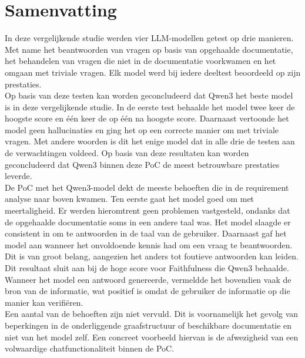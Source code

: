 \section{Samenvatting}
In deze vergelijkende studie werden vier LLM-modellen getest op drie manieren. Met name het beantwoorden van vragen op basis van opgehaalde documentatie, het behandelen van vragen die niet in de documentatie voorkwamen en het omgaan met triviale vragen. Elk model werd bij iedere deeltest beoordeeld op zijn prestaties.
\\[1em]
Op basis van deze testen kan worden geconcludeerd dat Qwen3 het beste model is in deze vergelijkende studie. In de eerste test behaalde het model twee keer de hoogste score en één keer de op één na hoogste score. Daarnaast vertoonde het model geen hallucinaties en ging het op een correcte manier om met triviale vragen. Met andere woorden is dit het enige model dat in alle drie de testen aan de verwachtingen voldeed. Op basis van deze resultaten kan worden geconcludeerd dat Qwen3 binnen deze PoC de meest betrouwbare prestaties leverde.
\\[1em]
De PoC met het Qwen3-model dekt de meeste behoeften die in de requirement analyse naar boven kwamen. Ten eerste gaat het model goed om met meertaligheid. Er werden hieromtrent geen problemen vastgesteld, ondanks dat de opgehaalde documentatie soms in een andere taal was. Het model slaagde er consistent in om te antwoorden in de taal van de gebruiker. Daarnaast gaf het model aan wanneer het onvoldoende kennis had om een vraag te beantwoorden. Dit is van groot belang, aangezien het anders tot foutieve antwoorden kan leiden. Dit resultaat sluit aan bij de hoge score voor Faithfulness die Qwen3 behaalde. Wanneer het model een antwoord genereerde, vermeldde het bovendien vaak de bron van de informatie, wat positief is omdat de gebruiker de informatie op die manier kan verifiëren.  
\\[1em]
Een aantal van de behoeften zijn niet vervuld. Dit is voornamelijk het gevolg van beperkingen in de onderliggende graafstructuur of beschikbare documentatie en niet van het model zelf. Een concreet voorbeeld hiervan is de afwezigheid van een volwaardige chatfunctionaliteit binnen de PoC.